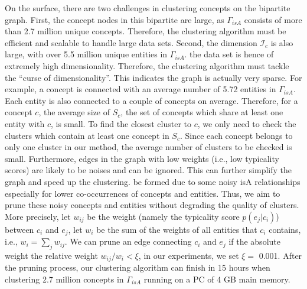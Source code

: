 On the surface, there are two challenges in clustering concepts
on the bipartite graph. First, the concept nodes in this bipartite are large,
as $\Gamma_{isA}$ consists of more than 2.7 million unique concepts.
Therefore, the clustering algorithm must be efficient and scalable
to handle large data sets.
Second, the dimension $\mathcal{I}_c$ is also large, with
over 5.5 million unique entities in $\Gamma_{isA}$.
the data set is hence of extremely high dimensionality.
Therefore, the clustering algorithm must tackle the
``curse of dimensionality''.
This indicates the graph is actually very sparse.
For example, a concept is connected with an average
number of 5.72 entities in $\Gamma_{isA}$. Each entity is also connected to a couple of concepts on average.
Therefore, for a concept $c$, the average size of $S_c$,
the set of concepts which share at least
one entity with $c$, is small.
To find the closest cluster to $c$,
we only need to check the clusters which contain at
least one concept in $S_c$. Since each concept belongs to only one
cluster in our method, the average number of clusters to be checked is small.
Furthermore, edges in the graph with low weights (i.e., low typicality scores)
are likely to be noises and can be ignored.
This can further simplify the graph and speed up the clustering.
be formed due to some noisy isA relationships especially for lower co-occurrences of concepts and entities. Thus, we aim to prune these noisy concepts and entities without degrading the quality of clusters. More precisely, let $w_{ij}$ be the weight (namely the typicality score $p(e_j|c_i)$) between $c_i$ and $e_j$, let $w_i$ be the sum
of the weights of all entities that $c_i$ contains, i.e.,
$w_i =\sum_j w_{ij}$. We can prune an edge connecting $c_i$ and $e_j$ if the absolute
weight the relative weight $w_{ij}/w_i < \xi$, in our experiments,
we set $\xi =$ 0.001.
After the pruning process, our clustering algorithm can finish in 15 hours when clustering 2.7 million concepts in $\Gamma_{isA}$ running on a PC of 4 GB main memory.



